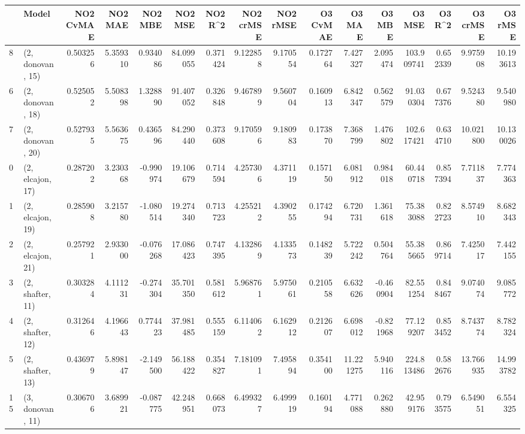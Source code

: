 \begin{tabular}{llrrrrrrrrrrrrrr}
\toprule
{} &             Model &  NO2 CvMAE &   NO2 MAE &   NO2 MBE &    NO2 MSE &   NO2 R\textasciicircum2 &  NO2 crMSE &  NO2 rMSE &  O3 CvMAE &     O3 MAE &    O3 MBE &      O3 MSE &    O3 R\textasciicircum2 &   O3 crMSE &    O3 rMSE \\
\midrule
8  &  (2, donovan, 15) &   0.503256 &  5.359310 &  0.934086 &  84.099055 &  0.371424 &   9.122858 &  9.170554 &  0.172764 &   7.427327 &  2.095474 &  103.909741 &  0.652339 &   9.975908 &  10.193613 \\
6  &  (2, donovan, 18) &   0.525052 &  5.508398 &  1.328890 &  91.407052 &  0.326848 &   9.467899 &  9.560704 &  0.160913 &   6.842347 &  0.562579 &   91.030304 &  0.677376 &   9.524380 &   9.540980 \\
7  &  (2, donovan, 20) &   0.527935 &  5.563675 &  0.436596 &  84.290440 &  0.373608 &   9.170596 &  9.180983 &  0.173870 &   7.368799 &  1.476802 &  102.617421 &  0.634710 &  10.021800 &  10.130026 \\
0  &  (2, elcajon, 17) &   0.287202 &  3.230368 & -0.990974 &  19.106679 &  0.714594 &   4.257306 &  4.371119 &  0.157150 &   6.081912 &  0.984018 &   60.440718 &  0.857394 &   7.711837 &   7.774363 \\
1  &  (2, elcajon, 19) &   0.285908 &  3.215780 & -1.080514 &  19.274340 &  0.713723 &   4.255212 &  4.390255 &  0.174294 &   6.720731 &  1.361618 &   75.383088 &  0.822723 &   8.574910 &   8.682343 \\
2  &  (2, elcajon, 21) &   0.257921 &  2.933000 & -0.076268 &  17.086423 &  0.747395 &   4.132869 &  4.133573 &  0.148239 &   5.722242 &  0.504764 &   55.385665 &  0.869714 &   7.425017 &   7.442155 \\
3  &  (2, shafter, 11) &   0.303284 &  4.111231 & -0.274304 &  35.701350 &  0.581612 &   5.968761 &  5.975061 &  0.210558 &   6.632626 & -0.460904 &   82.551254 &  0.848467 &   9.074074 &   9.085772 \\
4  &  (2, shafter, 12) &   0.312646 &  4.196643 &  0.774423 &  37.981485 &  0.555159 &   6.114062 &  6.162912 &  0.212607 &   6.698012 & -0.821968 &   77.129207 &  0.853452 &   8.743774 &   8.782324 \\
5  &  (2, shafter, 13) &   0.436979 &  5.898147 & -2.149500 &  56.188422 &  0.354827 &   7.181091 &  7.495894 &  0.354100 &  11.221275 &  5.940116 &  224.813486 &  0.582676 &  13.766935 &  14.993782 \\
15 &  (3, donovan, 11) &   0.306706 &  3.689921 & -0.087775 &  42.248951 &  0.668073 &   6.499327 &  6.499919 &  0.160194 &   4.771088 &  0.262880 &   42.959176 &  0.793575 &   6.549051 &   6.554325 \\

\end{tabular}
